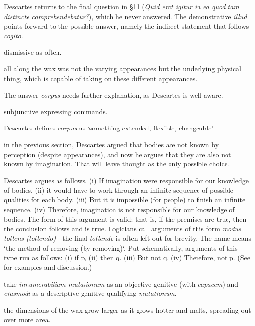  Descartes returns to the final question in §11 (\textit{Quid erat igitur in ea quod tam distincte comprehendebatur?}), which he never answered. The demonstrative \textit{illud} points forward to the possible answer, namely the indirect statement that follows \textit{cogito}.

 dismissive as often.

 all along the wax was not the varying appearances but the underlying physical thing, which is capable of taking on these different appearances.

 The answer \textit{corpus} needs further explanation, as Descartes is well aware.

 subjunctive expressing commands.

 Descartes defines \textit{corpus} as `something extended, flexible, changeable'.

 in the previous section, Descartes argued that bodies are not known by perception (despite appearances), and now he argues that they are also not known by imagination. That will leave thought as the only possible choice.

 Descartes argues as follows. (i) If imagination were responsible for our knowledge of bodies, (ii) it would have to work through an infinite sequence of possible qualities for each body. (iii) But it is impossible (for people) to finish an infinite sequence. (iv) Therefore, imagination is not responsible for our knowledge of bodies. The form of this argument is valid: that is, if the premises are true, then the conclusion follows and is true. Logicians call arguments of this form \textit{modus tollens (tollendo)}---the final \textit{tollendo} is often left out for brevity. The name means `the method of removing (by removing)`. Put schematically, arguments of this type run as follows: (i) if p, (ii) then q. (iii) But not q. (iv) Therefore, not p. (See \citep[§23]{weston2009} for examples and discussion.)

 take \textit{innumerabilium mutationum} as an objective genitive (with \textit{capacem}) and \textit{eiusmodi} as a descriptive genitive qualifying \textit{mutationum}.

 the dimensions of the wax grow larger as it grows hotter and melts, spreading out over more area.

